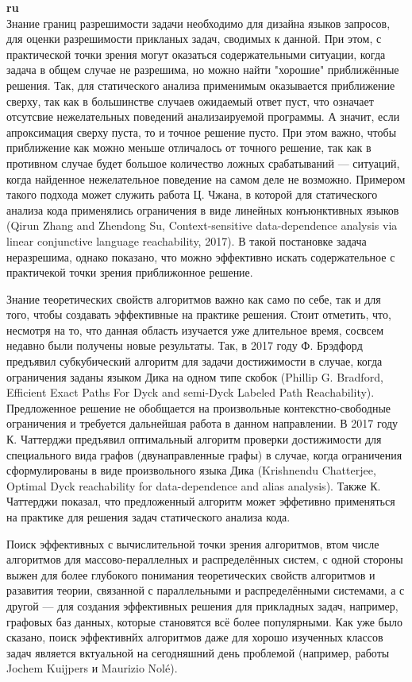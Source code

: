 \documentclass[12pt]{article}  %
\theoremstyle{remark}
\begin{document}
\textbf{ru}\\
%
Знание границ разрешимости задачи необходимо для дизайна языков запросов, для оценки разрешимости прикланых задач, сводимых к данной.
При этом, с практической точки зрения могут оказаться содержательными ситуации, когда задача в общем случае не разрешима, но можно найти "хорошие" приближённые решения. Так, для статического анализа применимым  оказывается приближение сверху, так как в большинстве случаев ожидаемый ответ пуст, что означает отсутсвие нежелательных поведений анализаируемой программы. А значит, если апроксимация сверху пуста, то и точное решение пусто. При этом важно, чтобы приближение как можно меньше отличалось от точного решение, так как в противном случае будет большое количество ложных срабатываний --- ситуаций, когда найденное нежелательное поведение на самом деле не возможно.
Примером такого подхода может служить работа Ц. Чжана, в которой для статического анализа кода применялись ограничения в виде линейных конъюнктивных языков (Qirun Zhang and Zhendong Su, Context-sensitive data-dependence analysis via linear conjunctive language reachability, 2017). В такой постановке задача неразрешима, однако показано, что можно эффективно искать содержательное с практичекой точки зрения приближонное решение.

Знание теоретических свойств алгоритмов важно как само по себе, так и для того, чтобы создавать эффективные на практике решения.
Стоит отметить, что, несмотря на то, что данная область изучается уже длительное время, сосвсем недавно были получены новые результаты. Так, в 2017 году Ф. Брэдфорд предъявил субкубический алгоритм для задачи достижимости в случае, когда ограничения заданы языком Дика на одном типе скобок (Phillip G. Bradford, Efficient Exact Paths For Dyck and semi-Dyck Labeled Path Reachability). Предложенное решение не обобщается на произвольные контекстно-свободные ограничения и требуется дальнейшая работа в данном направлении.
В 2017 году К. Чаттерджи предъявил оптимальный алгоритм проверки достижимости для специального вида графов (двунаправленные графы) в случае, когда ограничения сформулированы в виде произвольного языка Дика (Krishnendu Chatterjee, Optimal Dyck reachability for data-dependence and alias analysis). Также К. Чаттерджи показал, что предложенный алгоритм может эффетивно применяться на практике для решения задач статического анализа кода.

Поиск эффективных с вычислительной точки зрения алгоритмов, втом числе алгоритмов для массово-пераллелных и распределённых систем, с одной стороны выжен для более глубокого понимания теоретических свойств алгоритмов и разавития теории, связанной с параллельными и распределёнными системами, а с другой --- для создания эффективных решения для прикладных задач, например, графовых баз данных, которые становятся всё более популярными. Как уже было сказано, поиск эффективнйх алгоритмов даже для хорошо изученных классов задач является вктуальной на сегодняшний день проблемой (например, работы Jochem Kuijpers и Maurizio Nolé).
\end{document}
